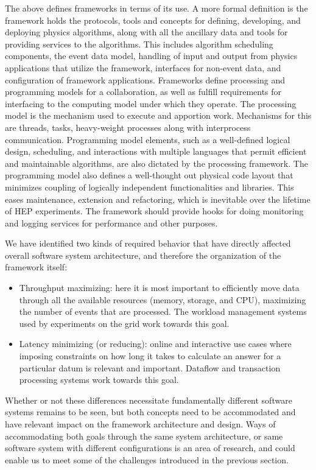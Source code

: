 \documentclass[12pt,a4paper]{article}
\begin{document}
The above defines frameworks in terms of its use. A more formal
definition is the framework holds the protocols, tools and concepts
for defining, developing, and deploying physics algorithms, along with
all the ancillary data and tools for providing services to the
algorithms.  This includes algorithm scheduling components, the event
data model, handling of input and output from physics applications
that utilize the framework, interfaces for non-event data, and
configuration of framework applications. Frameworks define processing
and programming models for a collaboration, as well as fulfill
requirements for interfacing to the computing model under which they
operate. The processing model is the mechanism used to execute and
apportion work. Mechanisms for this are threads, tasks, heavy-weight
processes along with interprocess communication. Programming model
elements, such as a well-defined logical design, scheduling, and
interactions with multiple languages that permit efficient and
maintainable algorithms, are also dictated by the processing
framework. The programming model also defines a well-thought out
physical code layout that minimizes coupling of logically independent
functionalities and libraries. This eases maintenance, extension and
refactoring, which is inevitable over the lifetime of HEP
experiments. The framework should provide hooks for doing monitoring
and logging services for performance and other purposes.

We have identified two kinds of required behavior that have directly
affected overall software system architecture, and therefore the
organization of the framework itself:

\begin{itemize}
\item
    Throughput maximizing: here it is most important to efficiently
    move data through all the available resources (memory, storage,
    and CPU), maximizing the number of events that are processed. The
    workload management systems used by experiments on the grid work
    towards this goal.
\item
    Latency minimizing (or reducing): online and interactive use
    cases where imposing constraints on how long it takes to calculate
    an answer for a particular datum is relevant and
    important. Dataflow and transaction processing systems work
    towards this goal.
\end{itemize}

Whether or not these differences necessitate fundamentally different
software systems remains to be seen, but both concepts need to be
accommodated and have relevant impact on the framework architecture
and design. Ways of accommodating both goals through the same system
architecture, or same software system with different configurations is
an area of research, and could enable us to meet some of the
challenges introduced in the previous section.
\end{document}
